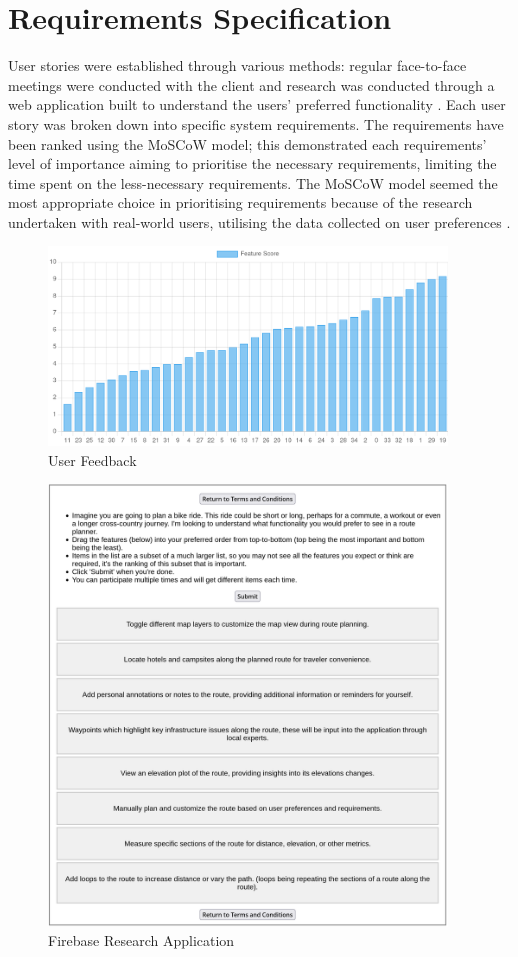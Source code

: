\section{Requirements Specification}
\label{requirements:specification}

User stories were established through various methods: regular face-to-face meetings were conducted with the client and research was conducted through a web application built to understand the users' preferred functionality . Each user story was broken down into specific system requirements. The requirements have been ranked using the MoSCoW model; this demonstrated each requirements' level of importance aiming to prioritise the necessary requirements, limiting the time spent on the less-necessary requirements. The MoSCoW model seemed the most appropriate choice in prioritising requirements because of the research undertaken with real-world users, utilising the data collected on user preferences .

\begin{figure}[!h]
  \centering
  \includegraphics[width=400px]{figures/logarithmic-scoring.png}
  \caption{User Feedback}
  \label{fig:userfeedback01}
\end{figure}

\begin{figure}
  \centering
  \includegraphics[width=400px]{figures/research-application.png}
  \caption{Firebase Research Application}
  \label{fig:researchapp}
\end{figure}

